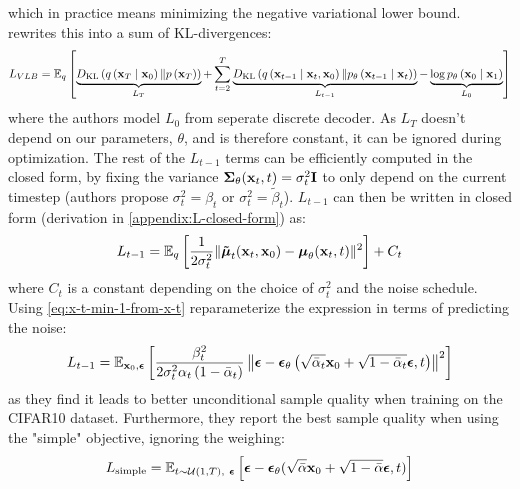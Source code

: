 which in practice means minimizing the negative variational lower bound. 
\cite{ho2020denoising} rewrites this into a sum of KL-divergences:
\begin{equation}
    L_{VLB} = \mathbb{E}_q \left[ \underbrace{D_{\mathrm{KL}} \left(
            q\left(\boldsymbol{\mathbf{x}}_T \mid \boldsymbol{\mathbf{x}}_0\right) \| p\left(\boldsymbol{\mathbf{x}}_T\right)
            \right)}_{L_T} + \sum_{t=2}^T \underbrace{D_{\mathrm{KL}}\left(q\left(\boldsymbol{\mathbf{x}}_{t-1} \mid \boldsymbol{\mathbf{x}}_t, \boldsymbol{\mathbf{x}}_0\right) \| p_\theta\left(\boldsymbol{\mathbf{x}}_{t-1} \mid \boldsymbol{\mathbf{x}}_t\right)\right)}_{L_{t-1}} - \underbrace{\log p_\theta\left(\boldsymbol{\mathbf{x}}_0 \mid \boldsymbol{\mathbf{x}}_1\right)}_{L_0} \right]
\end{equation}
where the authors model $L_0$ from seperate discrete decoder. As $L_T$ doesn't depend on our parameters, $\theta$, and is therefore constant, it can be ignored during optimization. The rest of the $L_{t-1}$ terms can be efficiently computed in the closed form, by fixing the variance $\boldsymbol{\mathbf{\Sigma}}_\theta(\boldsymbol{\mathbf{x}}_t, t) = \sigma_t^2 \boldsymbol{\mathbf{I}}$ to only depend on the current timestep (authors propose $\sigma_t^2 = \beta_t$ or $\sigma_t^2 = \tilde{\beta}_t$). $L_{t-1}$ can then be written in closed form (derivation in \cref{appendix:L-closed-form}) as:
\begin{equation}
    L_{t-1} = \mathbb{E}_q \left[ \frac{1}{2\sigma_t^2} \| \boldsymbol{\mathbf{\tilde{\mu}}}_t(\boldsymbol{\mathbf{x}}_t, \boldsymbol{\mathbf{x}}_0) - \boldsymbol{\mathbf{\mu}}_\theta(\boldsymbol{\mathbf{x}}_t, t) \|^2 \right] + C_t
\end{equation}
where $C_t$ is a constant depending on the choice of $\sigma_t^2$ and the noise schedule. Using \cref{eq:x-t-min-1-from-x-t} \cite{ho2020denoising} reparameterize the expression in terms of predicting the noise:
\begin{equation}
    L_{t-1} = \mathbb{E}_{\boldsymbol{\mathbf{x}}_0, \boldsymbol{\mathbf{\epsilon}}}\left[
        \frac{\beta_t^2}{2 \sigma_t^2 \alpha_t \left( 1 - \bar{\alpha}_t\right)} \left\| 
            \boldsymbol{\mathbf{\epsilon}}-\boldsymbol{\mathbf{\epsilon}}_\theta \left(\sqrt{\bar{\alpha}_t} \boldsymbol{\mathbf{x}}_0+\sqrt{1-\bar{\alpha}_t} \boldsymbol{\mathbf{\epsilon}}, t\right)
            \right\|^2
    \right]
\end{equation}
as they find it leads to better unconditional sample quality when training on the CIFAR10 dataset. Furthermore, they report the best sample quality when using the "simple" objective, ignoring the weighing:
\begin{equation} \label{eq:ddpm-simple-objective}
    L_\mathrm{simple} = \mathbb{E}_{t \sim \mathcal{U}(1, T),\ \vect{\epsilon}} \left[
        \vect{\epsilon} - \vect{\epsilon}_\theta( \sqrt{\bar{\alpha}} \vect{x}_0 + \sqrt{1 - \bar{\alpha}}\vect{\epsilon}, t)
    \right]
\end{equation}

